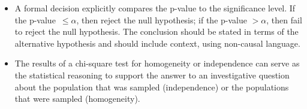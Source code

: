 \begin{itemize}
\item A formal decision explicitly compares the p-value to the significance level.  If the \mbox{p-value $\le \alpha$,} then reject the null hypothesis; if the p-value $> \alpha$, then fail to reject the null hypothesis.  The conclusion should be stated in terms of the alternative hypothesis and should include context, using non-causal language.

\item The results of a chi-square test for homogeneity or independence can serve
as the statistical reasoning to support the answer to an investigative question
about the population that was sampled (independence) or the populations that
were sampled (homogeneity).
\end{itemize}


{}


\reviewchapterheader{}

